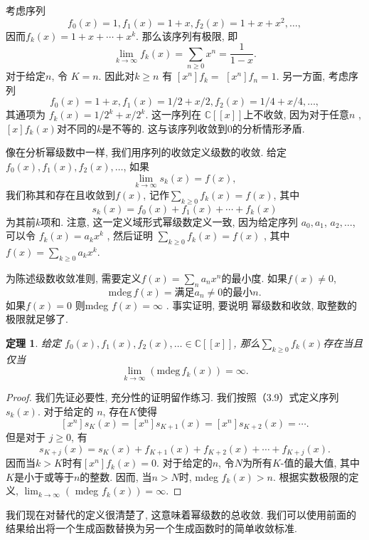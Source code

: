 \documentclass[a4paper,12pt]{ctexbook}
\newtheorem{theorem}[lemma]{\hspace{2em}定理}%
\begin{document}
考虑序列
$$
f_{0}(x)=1, f_{1}(x)=1+x, f_{2}(x)=1+x+x^{2}, \ldots,
$$
因而$f_{k}(x)=1+x+\cdots+x^{k}$. 那么该序列有极限, 即
$$
\lim _{k \rightarrow \infty} f_{k}(x)=\sum_{n \geq 0} x^{n}=\frac{1}{1-x} .
$$
对于给定$n$, 令  $K=n$. 因此对$k \geq n$ 有 $\left[x^{n}\right] f_{k}=$ $\left[x^{n}\right] f_{n}=1 $.  另一方面, 考虑序列
$$
f_{0}(x)=1+x, f_{1}(x)=1 / 2+x / 2, f_{2}(x)=1 / 4+x / 4, \ldots,
$$
其通项为 $f_{k}(x)=1 / 2^{k}+x / 2^{k}$. 这一序列在 $\mathbb{C}[[x]]$上不收敛, 因为对于任意$n$ ,  $[x] f_{k}(x)$对不同的$k$是不等的. 这与该序列收敛到0的分析情形矛盾.

像在分析幂级数中一样, 我们用序列的收敛定义级数的收敛. 给定
$f_{0}(x), f_{1}(x), f_{2}(x), \ldots$, 如果$$
\lim _{k \rightarrow \infty} s_{k}(x)=f(x),
$$
我们称其和存在且收敛到$f(x)$, 记作$\sum_{k \geq 0} f_{k}(x)=f(x)$, 其中
$$
s_{k}(x)=f_{0}(x)+f_{1}(x)+\cdots+f_{k}(x)
$$
为其前$k$项和. 注意, 这一定义域形式幂级数定义一致, 因为给定序列  $a_{0}, a_{1}$, $a_{2}, \ldots$, 可以令 $f_{k}(x)=a_{k} x^{k}$ , 然后证明 $\sum_{k \geq 0} f_{k}(x)=f(x)$ , 其中 $f(x)=\sum_{k \geq 0} a_{k} x^{k}$.

为陈述级数收敛准则, 需要定义$f(x)=\sum_{n} a_{n} x^{n}$的最小度. 如果$f(x) \neq 0$, \[
\text{mdeg}\, f(x)=\text{满足}a_{n} \neq 0\text{的最小}n.
\]
如果$f(x)=0$ 则mdeg $f(x)=\infty$ . 事实证明, 要说明
幂级数和收敛, 取整数的极限就足够了.
\begin{theorem}
	给定 $f_{0}(x), f_{1}(x), f_{2}(x), \ldots \in \mathbb{C}[[x]]$, 那么$\sum_{k \geq 0} f_{k}(x)$存在当且仅当
	\[
	\lim _{k \rightarrow \infty} \left( \mbox{mdeg}\, f_{k}(x)\right)=\infty.
	\]
\end{theorem}
\begin{proof}
	我们先证必要性, 充分性的证明留作练习. 我们按照（3.9）式定义序列 $s_{k}(x)$. 对于给定的 $n$, 存在$K$使得
	$$
	\left[x^{n}\right] s_{K}(x)=\left[x^{n}\right] s_{K+1}(x)=\left[x^{n}\right] s_{K+2}(x)=\cdots .
	$$但是对于 $j \geq 0$, 有$$
	s_{K+j}(x)=s_{K}(x)+f_{K+1}(x)+f_{K+2}(x)+\cdots+f_{K+j}(x).
	$$因而当$k>K$时有$\left[x^{n}\right] f_{k}(x)=0$. 对于给定的$n$, 令$N$为所有$K$-值的最大值, 其中$K$是小于或等于$n$的整数. 因而, 当$n>N$时,  mdeg $f_{k}(x)>n$. 根据实数极限的定义, $\lim _{k \rightarrow \infty}\left(\right.$ mdeg $\left.f_{k}(x)\right)=\infty$.
\end{proof}

我们现在对替代的定义很清楚了, 这意味着幂级数的总收敛. 我们可以使用前面的结果给出将一个生成函数替换为另一个生成函数时的简单收敛标准.
\end{document}
